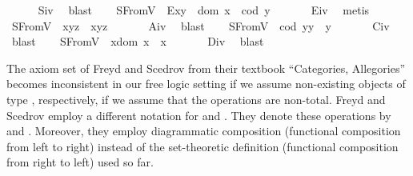 \begin{isabellebody}
%
\isadelimproof
\ \ \ \ %
\endisadelimproof
%
\isatagproof
{}\isamarkupfalse%
\ S\isactrlsub i\isactrlsub v\ \isamarkupfalse%
\ blast%
\endisatagproof
{\isafoldproof}%
%
\isadelimproof
\isanewline
%
\endisadelimproof
\ \ \isamarkupfalse%
\ S{}FromV{\isacharcolon}\ \ {\isachardoublequoteopen}E{\isacharparenleft}x{\isasymcdot}y{\isacharparenright}\ \isactrlbold {\isasymleftrightarrow}\ dom\ x\ {\isasymsimeq}\ cod\ y{\isachardoublequoteclose}\ \isanewline
%
\isadelimproof
\ \ \ \ %
\endisadelimproof
%
\isatagproof
{}\isamarkupfalse%
\ E\isactrlsub i\isactrlsub v\ \isamarkupfalse%
\ metis%
\endisatagproof
{\isafoldproof}%
%
\isadelimproof
\isanewline
%
\endisadelimproof
\ \ \isamarkupfalse%
\ S{}FromV{\isacharcolon}\ \ {\isachardoublequoteopen}x{\isasymcdot}{\isacharparenleft}y{\isasymcdot}z{\isacharparenright}\ {\isasymcong}\ {\isacharparenleft}x{\isasymcdot}y{\isacharparenright}{\isasymcdot}z{\isachardoublequoteclose}\ \isanewline
%
\isadelimproof
\ \ \ \ %
\endisadelimproof
%
\isatagproof
{}\isamarkupfalse%
\ A\isactrlsub i\isactrlsub v\ \isamarkupfalse%
\ blast%
\endisatagproof
{\isafoldproof}%
%
\isadelimproof
\isanewline
%
\endisadelimproof
\ \ \isamarkupfalse%
\ S{}FromV{\isacharcolon}\ \ {\isachardoublequoteopen}{\isacharparenleft}cod\ y{\isacharparenright}{\isasymcdot}y\ {\isasymcong}\ y{\isachardoublequoteclose}\ \isanewline
%
\isadelimproof
\ \ \ \ %
\endisadelimproof
%
\isatagproof
{}\isamarkupfalse%
\ C\isactrlsub i\isactrlsub v\ \isamarkupfalse%
\ blast%
\endisatagproof
{\isafoldproof}%
%
\isadelimproof
\isanewline
%
\endisadelimproof
\ \ \isamarkupfalse%
\ S{}FromV{\isacharcolon}\ \ {\isachardoublequoteopen}x{\isasymcdot}{\isacharparenleft}dom\ x{\isacharparenright}\ {\isasymcong}\ x{\isachardoublequoteclose}\ \isanewline
%
\isadelimproof
\ \ \ \ %
\endisadelimproof
%
\isatagproof
{}\isamarkupfalse%
\ D\isactrlsub i\isactrlsub v\ \isamarkupfalse%
\ blast%
\endisatagproof
{\isafoldproof}%
%
\isadelimproof
%
\endisadelimproof
%
\isamarkuptrue%
%
\begin{isamarkuptext}%
The axiom set of Freyd and Scedrov from their textbook
 ``Categories, Allegories'' \cite{FreydScedrov90} becomes inconsistent in our free logic setting if we assume 
  non-existing objects of type , respectively, if we assume that the operations are 
  non-total.  Freyd and Scedrov employ a different notation for 
   and . They denote these operations by  
  and . Moreover, they employ diagrammatic composition  
  (functional composition from left to right) instead of the set-theoretic 
  definition  (functional composition from right to left) used so far.
 

\end{isamarkuptext}
\end{isabellebody}
